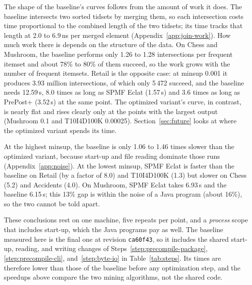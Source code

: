 The shape of the baseline's curves follows from the amount of work it does. The baseline
intersects two sorted tidsets by merging them, so each intersection costs time
proportional to the combined length of the two tidsets; its time tracks that length at
2.0 to 6.9\,ns per merged element (Appendix~\ref{app:join-work}). How much work there is
depends on the structure of the data. On Chess and Mushroom, the baseline performs only
1.26 to 1.28 intersections per frequent itemset and about 78\% to 80\% of them succeed, so
the work grows with the number of frequent itemsets. Retail is the opposite case: at
minsup 0.001 it produces 3.93 million intersections, of which only 5\,472 succeed, and
the baseline needs 12.59\,s, 8.0 times as long as SPMF Eclat (1.57\,s) and 3.6 times as
long as PrePost+ (3.52\,s) at the same point. The optimized variant's curve, in contrast,
is nearly flat and rises clearly only at the points with the largest output (Mushroom 0.1
and T10I4D100K 0.00025). Section~\ref{sec:future} looks at where the optimized variant
spends its time.

At the highest minsup, the baseline is only 1.06 to 1.46 times slower than the optimized
variant, because start-up and file reading dominate those runs
(Appendix~\ref{app:noise}). At the lowest minsup, SPMF Eclat is faster than the baseline on Retail (by a factor of 8.0) and T10I4D100K (1.3)
but slower on Chess (5.2) and Accidents (4.0). On Mushroom, SPMF Eclat takes 6.93\,s and
the baseline 6.15\,s; this 13\% gap is within the noise of a Java program (about 16\%), so
the two cannot be told apart.

These conclusions rest on one machine, five repeats per point, and a \emph{process} scope
that includes start-up, which the Java programs pay as well. The baseline measured here is
the final one at revision \texttt{ca60f43}, so it includes the shared start-up,
reading, and writing changes of Steps~\ref{step:precompile-package},
\ref{step:precompile-cli}, and~\ref{step:byte-io} in Table~\ref{tab:steps}. Its times are
therefore lower than those of the baseline before any optimization step, and the speedups
above compare the two mining algorithms, not the shared code.

